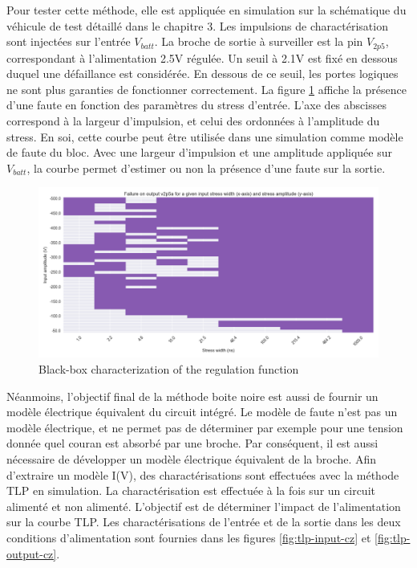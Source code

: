 Pour tester cette méthode, elle est appliquée en simulation sur la schématique du véhicule de test détaillé dans le chapitre 3.
Les impulsions de charactérisation sont injectées sur l'entrée $V_{batt}$.
La broche de sortie à surveiller est la pin $V_{2p5}$, correspondant à l'alimentation 2.5V régulée.
Un seuil à 2.1V est fixé en dessous duquel une défaillance est considérée.
En dessous de ce seuil, les portes logiques ne sont plus garanties de fonctionner correctement.
La figure \ref{fig:cz-black-box} affiche la présence d'une faute en fonction des paramètres du stress d'entrée.
L'axe des abscisses correspond à la largeur d'impulsion, et celui des ordonnées à l'amplitude du stress.
En soi, cette courbe peut être utilisée dans une simulation comme modèle de faute du bloc.
Avec une largeur d'impulsion et une amplitude appliquée sur $V_{batt}$, la courbe permet d'estimer ou non la présence d'une faute sur la sortie.

\begin{figure}[!h]
  \centering
  \includegraphics[width=\textwidth]{src/1/figures/black_box_regulator.png}
  \caption{Black-box characterization of the regulation function}
  \label{fig:cz-black-box}
\end{figure}

Néanmoins, l'objectif final de la méthode boite noire est aussi de fournir un modèle électrique équivalent du circuit intégré.
Le modèle de faute n'est pas un modèle électrique, et ne permet pas de déterminer par exemple pour une tension donnée quel couran est absorbé par une broche.
Par conséquent, il est aussi nécessaire de développer un modèle électrique équivalent de la broche.
Afin d'extraire un modèle I(V), des charactérisations sont effectuées avec la méthode TLP en simulation.
La charactérisation est effectuée à la fois sur un circuit alimenté et non alimenté.
L'objectif est de déterminer l'impact de l'alimentation sur la courbe TLP.
Les charactérisations de l'entrée et de la sortie dans les deux conditions d'alimentation sont fournies dans les figures \ref{fig:tlp-input-cz} et \ref{fig:tlp-output-cz}.

